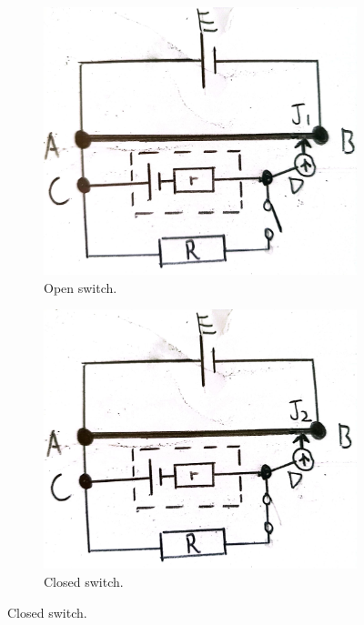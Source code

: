 \begin{itemize}
\begin{itemize}
\begin{figure}[H]
\begin{subfigure}{0.45\textwidth}
                \includegraphics[width=\textwidth]{../images/DC-Circuits-Potentiometer-2.jpg}
                \caption{Open switch.}
                \label{fig:potentiometer-open-switch}
            \end{subfigure}\hfill
            \begin{subfigure}{0.45\textwidth}
                \centering
                \includegraphics[width=\textwidth]{../images/DC-Circuits-Potentiometer-2.2.jpg}
                \caption{Closed switch.}
                \label{fig:potentiometer-closed-switch}

\end{subfigure}
\end{figure}
\end{itemize}
\end{itemize}
